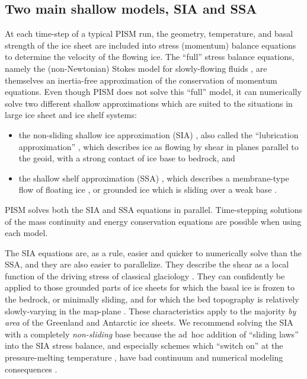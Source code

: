 \documentclass[titlepage,letterpaper,final]{scrartcl}
\begin{document}
\subsection{Two main shallow models, SIA and SSA}  At each time-step of a typical PISM run, the geometry, temperature, and basal strength of the ice sheet are included into stress (momentum) balance equations to determine the velocity of the flowing ice.   The ``full'' stress balance equations, namely the (non-Newtonian) Stokes model for slowly-flowing fluids \cite{Fowler}, are themselves an inertia-free approximation of the conservation of momentum equations.  Even though PISM does not solve this ``full'' model, it can numerically solve two different shallow approximations which are suited to the situations in large ice sheet and ice shelf systems:
\begin{itemize}
\item the non-sliding shallow ice approximation (SIA) \cite{Hutter}, also called the ``lubrication approximation'' \cite{Fowler}, which describes ice as flowing by shear in planes parallel to the geoid, with a strong contact of ice base to bedrock, and
\item the shallow shelf approximation (SSA) \cite{WeisGreveHutter}, which describes a membrane-type flow of floating ice \cite{Morland}, or grounded ice which is sliding over a weak base \cite{MacAyeal,SchoofStream}.
\end{itemize}
PISM solves both the SIA and SSA equations in parallel.  Time-stepping solutions of the mass continuity and energy conservation equations are possible when using each model.

The SIA equations are, as a rule, easier and quicker to numerically solve than the SSA, and they are also easier to parallelize.  They describe the shear as a local function of the driving stress of classical glaciology \cite{Paterson}.  They can confidently be applied to those grounded parts of ice sheets for which the basal ice is frozen to the bedrock, or minimally sliding, and for which the bed topography is relatively slowly-varying in the map-plane \cite{Fowler}.  These characteristics apply to the majority \emph{by area} of the Greenland and Antarctic ice sheets.  We recommend solving the SIA with a completely \emph{non-sliding} base because the ad~hoc addition of ``sliding laws'' into the SIA stress balance, and especially schemes which ``switch on'' at the pressure-melting temperature \cite{EISMINT00}, have bad continuum and numerical modeling consequences \cite[appendix B]{BBssasliding}.
\end{document}
